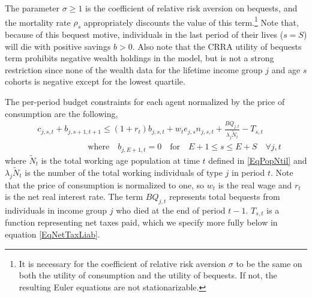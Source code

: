 \documentclass[letterpaper,12pt]{article}
\theoremstyle{definition}
\begin{document}
\begin{spacing}{1.5}
    The parameter $\sigma\geq 1$ is the coefficient of relative risk aversion on bequests, and the mortality rate $\rho_s$ appropriately discounts the value of this term.\footnote{It is necessary for the coefficient of relative risk aversion $\sigma$ to be the same on both the utility of consumption and the utility of bequests. If not, the resulting Euler equations are not stationarizable.} Note that, because of this bequest motive, individuals in the last period of their lives ($s=S$) will die with positive savings $b>0$. Also note that the CRRA utility of bequests term prohibits negative wealth holdings in the model, but is not a strong restriction since none of the wealth data for the lifetime income group $j$ and age $s$ cohorts is negative except for the lowest quartile.

    The per-period budget constraints for each agent normalized by the price of consumption are the following,
    \begin{equation}\label{EqBC}
      \begin{split}
        &c_{j,s,t} + b_{j,s+1,t+1} \leq \left(1 + r_t\right) b_{j,s,t} + w_t e_{j,s}n_{j,s,t} + \frac{BQ_{j,t}}{\lambda_j\tilde{N}_t} - T_{s,t} \\
        &\qquad\qquad\qquad\text{where}\quad b_{j,E+1,t} = 0\quad\text{for} \quad E+1\leq s \leq E+S \quad \forall j,t
      \end{split}
    \end{equation}
    where $\tilde{N}_t$ is the total working age population at time $t$ defined in \eqref{EqPopNtil} and $\lambda_j\tilde{N}_t$ is the number of the total working individuals of type $j$ in period $t$. Note that the price of consumption is normalized to one, so $w_t$ is the real wage and $r_t$ is the net real interest rate. The term $BQ_{j,t}$ represents total bequests from individuals in income group $j$ who died at the end of period $t-1$. $T_{s,t}$ is a function representing net taxes paid, which we specify more fully below in equation \eqref{EqNetTaxLiab}.


\end{spacing}
\end{document}
